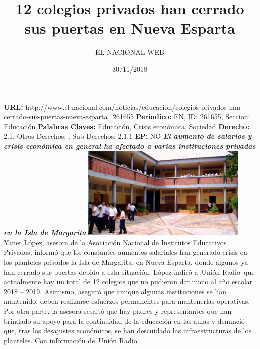 \documentclass{article}%
\title{\textbf{12 colegios privados han cerrado sus puertas en Nueva Esparta}}%
\author{EL NACIONAL WEB}%
\date{30/11/2018}%
\begin{document}
%
\normalsize%
\maketitle%
\textbf{URL: }%
http://www.el{-}nacional.com/noticias/educacion/colegios{-}privados{-}han{-}cerrado{-}sus{-}puertas{-}nueva{-}esparta\_261655\newline%
%
\textbf{Periodico: }%
EN, %
ID: %
261655, %
Seccion: %
Educación\newline%
%
\textbf{Palabras Claves: }%
Educación, Crisis económica, Sociedad\newline%
%
\textbf{Derecho: }%
2.1, %
Otros Derechos: %
, %
Sub Derechos: %
2.1.1\newline%
%
\textbf{EP: }%
NO\newline%
\newline%
%
\textbf{\textit{El aumento de salarios y crisis económica en general ha afectado a varias instituciones privadas en la Isla de Margarita}}%
\newline%
\newline%
%
\includegraphics[width=300px]{142.jpg}%
\newline%
%
Yanet López, asesora de la Asociación Nacional de Institutos Educativos Privados, informó que los constantes aumentos salariales han generado crisis en los planteles privados la Isla de Margarita, en Nueva Esparta, donde algunos ya han cerrado sus puertas debido a esta situación.%
\newline%
%
López indicó a~Unión Radio~que actualmente hay un total de 12 colegios que no pudieron dar inicio al año escolar 2018 – 2019. Asimismo, aseguró que aunque algunas instituciones se han mantenido, deben realizarse esfuerzos permanentes para mantenerlas operativas.%
\newline%
%
Por otra parte, la asesora resaltó que hay padres y representantes que han brindado su apoyo para la continuidad de la educación en las aulas y denunció que, tras los desajustes económicos, se han descuidado las infraestructuras de los planteles.%
\newline%
%
Con información de~Unión Radio.%
\newline%
%
\end{document}
